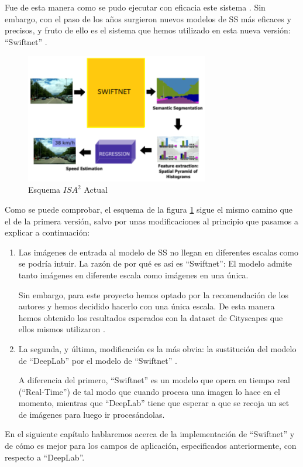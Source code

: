 Fue de esta manera como se pudo ejecutar con eficacia este sistema \cite{isa2}. Sin embargo, con el paso de los años surgieron nuevos modelos de \ac{SS} más eficaces y precisos, y fruto de ello es el sistema que hemos utilizado en esta nueva versión: ``Swiftnet'' \cite{swiftnet}.


\begin{figure}[H]
  \centering
  \includegraphics[width=8cm]{Figuras/Figura_Esquema_ISA2_Version_2.eps}
  \caption{Esquema $ISA^{2}$ Actual}
    \label{fig:Isa_v2}
\end{figure}


Como se puede comprobar, el esquema de la figura \ref{fig:Isa_v2} sigue el mismo camino que el de la primera versión, salvo por unas modificaciones al principio que pasamos a explicar a continuación:

\begin{enumerate}

\item Las imágenes de entrada al modelo de \ac{SS} no llegan en diferentes escalas como se podría intuir. La razón de por qué es así es ``Swiftnet'': El modelo admite tanto imágenes en diferente escala como imágenes en una única.


Sin embargo, para este proyecto hemos optado por la recomendación de los autores \cite{github_swiftnet} y hemos decidido hacerlo con una única escala. De esta manera hemos obtenido los resultados esperados con la dataset de Cityscapes \cite{cityscapes} que ellos mismos utilizaron \cite{swiftnet}.

\item La segunda, y última, modificación es la más obvia: la sustitución del modelo de ``DeepLab'' \cite{deeplab} por el modelo de ``Swiftnet'' \cite{swiftnet}.

A diferencia del primero, ``Swiftnet'' es un modelo que opera en tiempo real (``Real-Time'') de tal modo que cuando procesa una imagen lo hace en el momento, mientras que ``DeepLab'' tiene que esperar a que se recoja un set de imágenes para luego ir procesándolas.

\end{enumerate}


En el siguiente capítulo hablaremos acerca de la implementación de ``Swiftnet'' y de cómo es mejor para los campos de aplicación, especificados anteriormente, con respecto a ``DeepLab''.